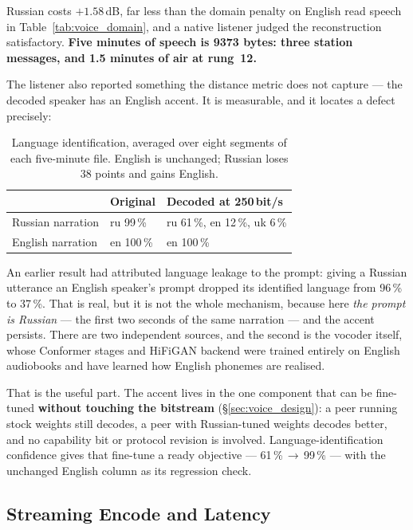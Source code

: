 Russian costs $+1.58$\,dB, far less than the domain penalty on English
read speech in Table~\ref{tab:voice_domain}, and a native listener
judged the reconstruction satisfactory.  \textbf{Five minutes of speech
is 9373 bytes: three station messages, and 1.5 minutes of air at
rung~12.}

The listener also reported something the distance metric does not
capture --- the decoded speaker has an English accent.  It is
measurable, and it locates a defect precisely:

\begin{table}[H]
    \centering
    \caption{Language identification, averaged over eight segments of
             each five-minute file.  English is unchanged; Russian loses
             38 points and gains English.}
    \label{tab:voice_accent}
    \small
    \begin{tabular}{@{}lll@{}}
    \toprule
    & \textbf{Original} & \textbf{Decoded at 250\,bit/s} \\
    \midrule
    Russian narration & ru 99\,\% & ru 61\,\%, en 12\,\%, uk 6\,\% \\
    English narration & en 100\,\% & en 100\,\% \\
    \bottomrule
    \end{tabular}
\end{table}

An earlier result had attributed language leakage to the prompt: giving
a Russian utterance an English speaker's prompt dropped its identified
language from 96\,\% to 37\,\%.  That is real, but it is not the whole
mechanism, because here \emph{the prompt is Russian} --- the first two
seconds of the same narration --- and the accent persists.  There are two
independent sources, and the second is the vocoder itself, whose
Conformer stages and HiFiGAN backend were trained entirely on English
audiobooks and have learned how English phonemes are realised.

That is the useful part.  The accent lives in the one component that can
be fine-tuned \textbf{without touching the bitstream}
(\S\ref{sec:voice_design}): a peer running stock weights still decodes,
a peer with Russian-tuned weights decodes better, and no capability bit
or protocol revision is involved.  Language-identification confidence
gives that fine-tune a ready objective --- 61\,\%\,$\rightarrow$\,99\,\%
--- with the unchanged English column as its regression check.

\subsection{Streaming Encode and Latency}
\label{sec:voice_streaming}

